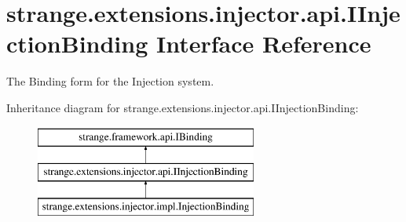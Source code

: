 \hypertarget{interfacestrange_1_1extensions_1_1injector_1_1api_1_1_i_injection_binding}{\section{strange.\-extensions.\-injector.\-api.\-I\-Injection\-Binding Interface Reference}
\label{interfacestrange_1_1extensions_1_1injector_1_1api_1_1_i_injection_binding}
}


The Binding form for the Injection system.  


Inheritance diagram for strange.\-extensions.\-injector.\-api.\-I\-Injection\-Binding\-:\begin{figure}[H]
\begin{center}
\leavevmode
\includegraphics[height=3.000000cm]{interfacestrange_1_1extensions_1_1injector_1_1api_1_1_i_injection_binding}
\end{center}
\end{figure}
